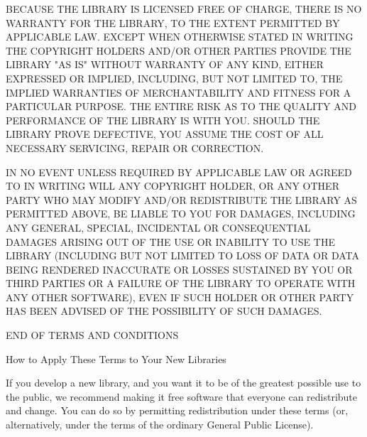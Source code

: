\begin{DoxyEnumerate}
\item BECAUSE THE LIBRARY IS LICENSED FREE OF CHARGE, THERE IS NO WARRANTY FOR THE LIBRARY, TO THE EXTENT PERMITTED BY APPLICABLE LAW. EXCEPT WHEN OTHERWISE STATED IN WRITING THE COPYRIGHT HOLDERS AND/\+OR OTHER PARTIES PROVIDE THE LIBRARY "{}\+AS IS"{} WITHOUT WARRANTY OF ANY KIND, EITHER EXPRESSED OR IMPLIED, INCLUDING, BUT NOT LIMITED TO, THE IMPLIED WARRANTIES OF MERCHANTABILITY AND FITNESS FOR A PARTICULAR PURPOSE. THE ENTIRE RISK AS TO THE QUALITY AND PERFORMANCE OF THE LIBRARY IS WITH YOU. SHOULD THE LIBRARY PROVE DEFECTIVE, YOU ASSUME THE COST OF ALL NECESSARY SERVICING, REPAIR OR CORRECTION.
\item IN NO EVENT UNLESS REQUIRED BY APPLICABLE LAW OR AGREED TO IN WRITING WILL ANY COPYRIGHT HOLDER, OR ANY OTHER PARTY WHO MAY MODIFY AND/\+OR REDISTRIBUTE THE LIBRARY AS PERMITTED ABOVE, BE LIABLE TO YOU FOR DAMAGES, INCLUDING ANY GENERAL, SPECIAL, INCIDENTAL OR CONSEQUENTIAL DAMAGES ARISING OUT OF THE USE OR INABILITY TO USE THE LIBRARY (INCLUDING BUT NOT LIMITED TO LOSS OF DATA OR DATA BEING RENDERED INACCURATE OR LOSSES SUSTAINED BY YOU OR THIRD PARTIES OR A FAILURE OF THE LIBRARY TO OPERATE WITH ANY OTHER SOFTWARE), EVEN IF SUCH HOLDER OR OTHER PARTY HAS BEEN ADVISED OF THE POSSIBILITY OF SUCH DAMAGES. \begin{DoxyVerb}                 END OF TERMS AND CONDITIONS

       How to Apply These Terms to Your New Libraries
\end{DoxyVerb}

\end{DoxyEnumerate}

If you develop a new library, and you want it to be of the greatest possible use to the public, we recommend making it free software that everyone can redistribute and change. You can do so by permitting redistribution under these terms (or, alternatively, under the terms of the ordinary General Public License).

